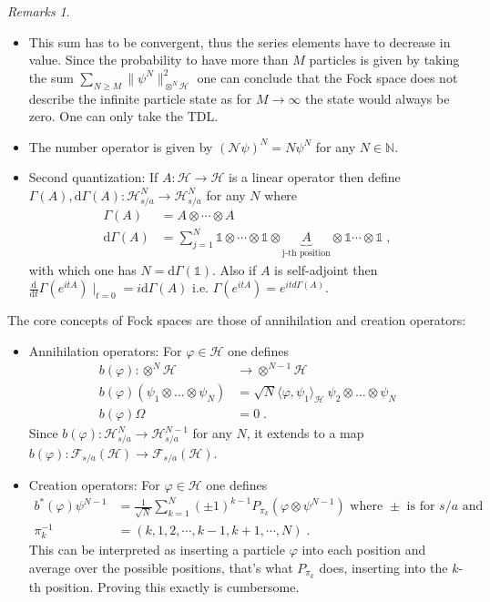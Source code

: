 \documentclass[
a4paper, %
11pt, %
onecolumn, %
openany, %
]{memoir}
\theoremstyle{definition}
\theoremstyle{remark}
\newtheorem{remarks}[definition]{Remarks}
\theoremstyle{plain}
\begin{document}
\begin{remarks}
	\begin{itemize}
		\item This sum has to be convergent, thus the series elements have to decrease in value. Since the probability to have more than $M$ particles is given by taking the sum $\sum_{N\geq M}\|\psi^N\|^2_{\otimes^N\mathcal{H}}$ one can conclude that the Fock space does not describe the infinite particle state as for $M\rightarrow\infty$ the state would always be zero. One can only take the TDL.
		\item The number operator is given by $(\mathcal{N}\psi)^N=N\psi^N$ for any $N\in \mathbb{N}$.
		\item Second quantization: If $A:\mathcal{H}\rightarrow \mathcal{H}$ is a linear operator then define $\Gamma(A),\mathrm{d}\Gamma(A):\mathcal{H}_{s/a}^N\rightarrow \mathcal{H}_{s/a}^N$ for any $N$ where \begin{align}
		\Gamma(A)&=A\otimes \cdots \otimes A\\
		\mathrm{d}\Gamma(A)&=\sum_{j=1}^N\mathds{1}\otimes\cdots\otimes \mathds{1}\otimes \underbrace{A}_{\text{j-th position}}\otimes \mathds{1}\cdots \otimes \mathds{1}\;,
		\end{align}
		with which one has $N=\mathrm{d}\Gamma(\mathds{1})$. Also if $A$ is self-adjoint then $\frac{\mathrm{d}}{\mathrm{d}t}\Gamma(e^{itA})\mid_{t=0}=i\mathrm{d}\Gamma(A)$ i.e. $\Gamma(e^{itA})=e^{itd\Gamma(A)}$.
	\end{itemize}
\end{remarks}
The core concepts of Fock spaces are those of annihilation and creation operators: \begin{itemize}
	\item Annihilation operators: For $\varphi\in\mathcal{H}$ one defines \begin{align}
	b(\varphi):\otimes^N\mathcal{H}&\longrightarrow \otimes^{N-1}\mathcal{H}\\
	b(\varphi)(\psi_1\otimes\ldots\otimes\psi_N)&=\sqrt{N}\langle \varphi,\psi_1\rangle_{\mathcal{H}}~\psi_2\otimes\ldots\otimes\psi_N\\
	b(\varphi)\Omega &= 0\; .
	\end{align}
	Since $b(\varphi):\mathcal{H}_{s/a}^N\rightarrow \mathcal{H}_{s/a}^{N-1}$ for any $N$, it extends to a map $b(\varphi):\mathcal{F}_{s/a}(\mathcal{H})\rightarrow \mathcal{F}_{s/a}(\mathcal{H})$.
	\item Creation operators: For $\varphi\in\mathcal{H}$ one defines \begin{align}
	b^*(\varphi)\psi^{N-1}&=\frac{1}{\sqrt{N}}\sum_{k=1}^{N}(\pm 1)^{k-1}P_{\pi_k}(\varphi\otimes \psi^{N-1}) \text{ where $\pm$ is for $s/a$ and}\\
	\pi_k^{-1}&=(k,1,2,\cdots,k-1,k+1,\cdots,N)\; .
	\end{align}
	This can be interpreted as inserting a particle $\varphi$ into each position and average over the possible positions, that's what $P_{\pi_k}$ does, inserting into the $k$-th position. Proving this exactly is cumbersome.
	\end{itemize}
\end{document}
